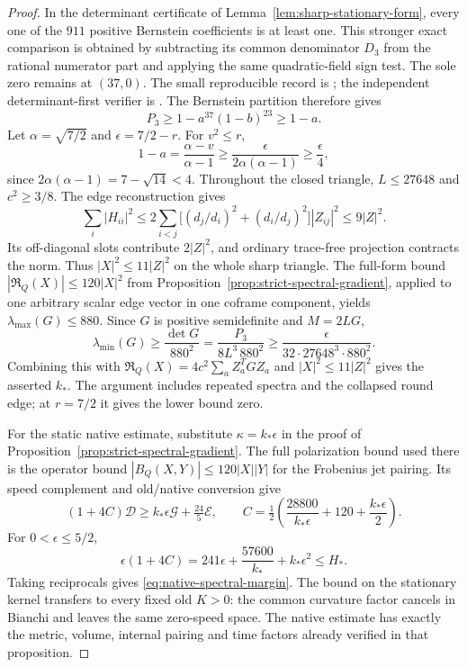 \documentclass[11pt]{article}
\numberwithin{equation}{section}
\theoremstyle{definition}
\theoremstyle{remark}
\begin{document}
\begin{proof}
In the determinant certificate of
Lemma~\ref{lem:sharp-stationary-form}, every one of the
$911$ positive Bernstein coefficients is at least one.
This stronger exact comparison is obtained by subtracting
its common denominator $D_3$ from the rational numerator
part and applying the same quadratic-field sign test.
The sole zero remains at $(37,0)$. The small reproducible
record is ;
the independent determinant-first verifier is
.
The Bernstein partition therefore gives
\[
 P_3\ge 1-a^{37}(1-b)^{23}\ge1-a.
\]
Let $\alpha=\sqrt{7/2}$ and $\epsilon=7/2-r$. For $v^2\le r$,
\[
 1-a=\frac{\alpha-v}{\alpha-1}
 \ge\frac{\epsilon}{2\alpha(\alpha-1)}
 \ge\frac{\epsilon}{4},
\]
since $2\alpha(\alpha-1)=7-\sqrt{14}<4$.
Throughout the closed triangle, $L\le27648$ and $c^2\ge3/8$.
The edge reconstruction gives
\[
 \sum_i|H_{ii}|^2
 \le2\sum_{i<j}\big[(d_j/d_i)^2+(d_i/d_j)^2\big]|Z_{ij}|^2
 \le9|Z|^2.
\]
Its off-diagonal slots contribute $2|Z|^2$, and ordinary
trace-free projection contracts the norm. Thus
$|X|^2\le11|Z|^2$ on the whole sharp triangle.
The full-form bound $|\mathfrak R_Q(X)|\le120|X|^2$
from Proposition~\ref{prop:strict-spectral-gradient},
applied to one arbitrary scalar edge vector in one coframe
component, yields $\lambda_{\max}(G)\le880$.
Since $G$ is positive semidefinite and $M=2LG$,
\[
 \lambda_{\min}(G)\ge\frac{\det G}{880^2}
 =\frac{P_3}{8L^3\,880^2}
 \ge\frac{\epsilon}{32\cdot27648^3\cdot880^2}.
\]
Combining this with
$\mathfrak R_Q(X)=4c^2\sum_aZ_a^TGZ_a$
and $|X|^2\le11|Z|^2$ gives the asserted $k_*$.
The argument includes repeated spectra and the collapsed
round edge; at $r=7/2$ it gives the lower bound zero.

For the static native estimate, substitute
$\kappa=k_*\epsilon$ in the proof of
Proposition~\ref{prop:strict-spectral-gradient}.
The full polarization bound used there is the operator bound
$|B_Q(X,Y)|\le120|X||Y|$ for the Frobenius jet pairing.
Its speed complement and old/native conversion give
\[
 (1+4C)\mathscr D\ge k_*\epsilon\mathscr G+\tfrac{24}{5}\mathscr E,
 \qquad C=\tfrac12\left(\frac{28800}{k_*\epsilon}
                           +120+\frac{k_*\epsilon}{2}\right).
\]
For $0<\epsilon\le5/2$,
\[
 \epsilon(1+4C)=241\epsilon+\frac{57600}{k_*}+k_*\epsilon^2
 \le H_*.
\]
Taking reciprocals gives \eqref{eq:native-spectral-margin}.
The bound on the stationary kernel transfers to every fixed
old $K>0$: the common curvature factor cancels in Bianchi
and leaves the same zero-speed space. The native estimate
has exactly the metric, volume, internal pairing and time
factors already verified in that proposition.
\end{proof}
\end{document}
